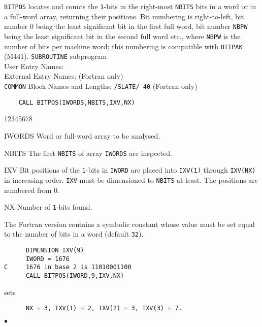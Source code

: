                         
        
\Submitter{}                            
{\tt BITPOS} locates and counts the {\tt 1}-bits in the right-most
{\tt NBITS} bits in a word or in a full-word array, returning their
positions. Bit numbering is right-to-left, bit number 0 being the least
significant bit in the first full word, bit number {\tt NBPW} being the
least significant bit in the second full word etc., where {\tt NBPW}
is the number of bits per machine word; this numbering is compatible
with {\tt BITPAK} (M441).
\Structure
{\tt SUBROUTINE} subprogram \\
User Entry Names: \\
External  Entry Names:  (Fortran only)\\
{\tt COMMON} Block Names and Lengths: {\tt /SLATE/ 40}
(Fortran only)
\Usage
\begin{verbatim}
    CALL BITPOS(IWORDS,NBITS,IXV,NX)
\end{verbatim}
\begin{DLtt}{12345678}
\item [IWORDS] Word or full-word array to be analysed.
\item [NBITS] The first {\tt NBITS} of array {\tt IWORDS} are inspected.
\item [IXV] Bit positions of the {\tt 1}-bits in {\tt IWORD} are placed
into {\tt IXV(1)} through {\tt IXV(NX)} in increasing order. {\tt IXV}
must be dimensioned to {\tt NBITS} at least. The positions are numbered
from 0.
\item [NX] Number of {\tt 1}-bits found.
\end{DLtt}
\Notes
The Fortran version contains a symbolic constant whose value must
be set equal to the number of bits in a word (default {\tt 32}).
\Examples
\begin{verbatim}
      DIMENSION IXV(9)
      IWORD = 1676
C     1676 in base 2 is 11010001100
      CALL BITPOS(IWORD,9,IXV,NX)
\end{verbatim}
sets
\begin{verbatim}
      NX = 3, IXV(1) = 2, IXV(2) = 3, IXV(3) = 7.
\end{verbatim}
$\bullet$
